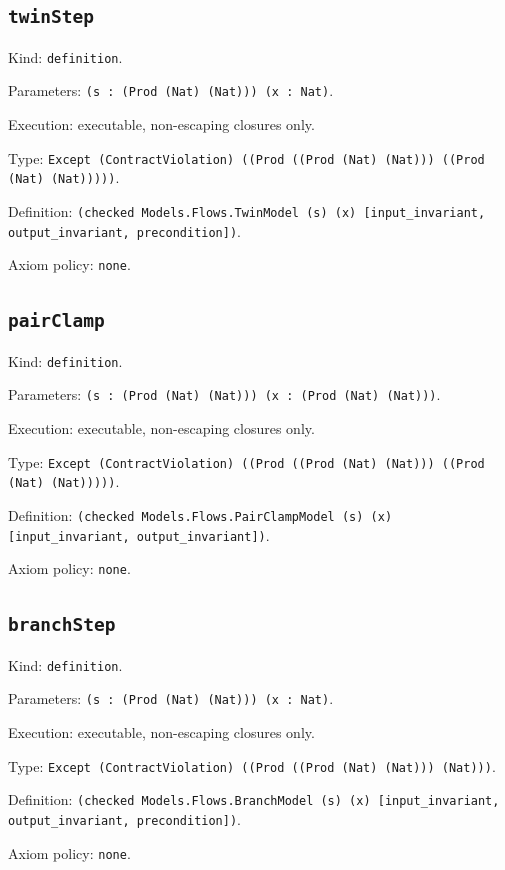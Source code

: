 \documentclass[11pt]{article}
\begin{document}
\subsection*{\texttt{twinStep}}
\noindent Kind: \texttt{definition}.\par
\noindent Parameters: \texttt{(s : (Prod (Nat) (Nat))) (x : Nat)}.\par
\noindent Execution: executable, non-escaping closures only.\par
\noindent Type: \texttt{Except (ContractViolation) ((Prod ((Prod (Nat) (Nat))) ((Prod (Nat) (Nat)))))}.\par
\noindent Definition: \texttt{(checked Models.Flows.TwinModel (s) (x) [input\_invariant, output\_invariant, precondition])}.\par
\noindent Axiom policy: \texttt{none}.\par
\subsection*{\texttt{pairClamp}}
\noindent Kind: \texttt{definition}.\par
\noindent Parameters: \texttt{(s : (Prod (Nat) (Nat))) (x : (Prod (Nat) (Nat)))}.\par
\noindent Execution: executable, non-escaping closures only.\par
\noindent Type: \texttt{Except (ContractViolation) ((Prod ((Prod (Nat) (Nat))) ((Prod (Nat) (Nat)))))}.\par
\noindent Definition: \texttt{(checked Models.Flows.PairClampModel (s) (x) [input\_invariant, output\_invariant])}.\par
\noindent Axiom policy: \texttt{none}.\par
\subsection*{\texttt{branchStep}}
\noindent Kind: \texttt{definition}.\par
\noindent Parameters: \texttt{(s : (Prod (Nat) (Nat))) (x : Nat)}.\par
\noindent Execution: executable, non-escaping closures only.\par
\noindent Type: \texttt{Except (ContractViolation) ((Prod ((Prod (Nat) (Nat))) (Nat)))}.\par
\noindent Definition: \texttt{(checked Models.Flows.BranchModel (s) (x) [input\_invariant, output\_invariant, precondition])}.\par
\noindent Axiom policy: \texttt{none}.\par
\end{document}
